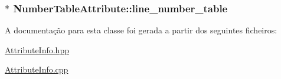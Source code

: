 \subsubsection[{\texorpdfstring{line\+\_\+number\+\_\+table}{line_number_table}}]{$\ast$ Number\+Table\+Attribute\+::line\+\_\+number\+\_\+table}\hypertarget{class_number_table_attribute_ab5e3c231f1507f7be6158422eb71aeeb}{}\label{class_number_table_attribute_ab5e3c231f1507f7be6158422eb71aeeb}


A documentação para esta classe foi gerada a partir dos seguintes ficheiros\+:\begin{DoxyCompactItemize}
\item 
\hyperlink{_attribute_info_8hpp}{Attribute\+Info.\+hpp}\item 
\hyperlink{_attribute_info_8cpp}{Attribute\+Info.\+cpp}\end{DoxyCompactItemize}
